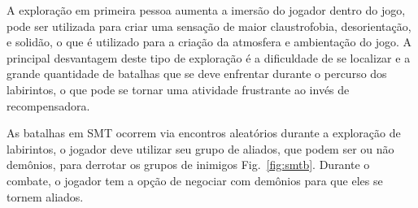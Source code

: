 \documentclass[
	12pt,				%
	openright,			%
	twoside,			%
	a4paper,			%
	english,			%
	french,				%
	spanish,			%
	brazil				%
	]{abntex2}
\begin{document}
A exploração em primeira pessoa aumenta a imersão do jogador dentro do jogo, pode ser utilizada para criar uma sensação de maior claustrofobia, desorientação, e solidão, o que é utilizado para a criação da atmosfera e ambientação do jogo. A principal desvantagem deste tipo de exploração é a dificuldade de se localizar e a grande quantidade de batalhas que se deve enfrentar durante o percurso dos labirintos, o que pode se tornar uma atividade frustrante ao invés de recompensadora.

As batalhas em SMT ocorrem via encontros aleatórios durante a exploração de labirintos, o jogador deve utilizar seu grupo de aliados, que podem ser ou não demônios, para derrotar os grupos de inimigos Fig.~\ref{fig:smtb}. Durante o combate, o jogador tem a opção de negociar com demônios para que eles se tornem aliados.
\end{document}

